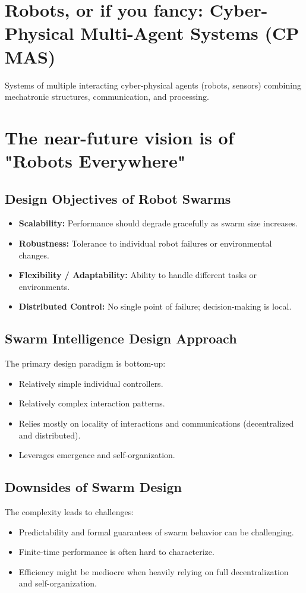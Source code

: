 \section*{Robots, or if you fancy: Cyber-Physical Multi-Agent Systems (CP MAS)}
Systems of multiple interacting cyber-physical agents (robots, sensors) combining mechatronic structures, communication, and processing.

\section*{The near-future vision is of "Robots Everywhere"}

\subsection*{Design Objectives of Robot Swarms}
\begin{itemize}
    \item \textbf{Scalability:} Performance should degrade gracefully as swarm size increases.
    \item \textbf{Robustness:} Tolerance to individual robot failures or environmental changes.
    \item \textbf{Flexibility / Adaptability:} Ability to handle different tasks or environments.
    \item \textbf{Distributed Control:} No single point of failure; decision-making is local.
\end{itemize}
\subsection*{Swarm Intelligence Design Approach}
The primary design paradigm is bottom-up:

\begin{itemize}
    \item Relatively simple individual controllers.
    \item Relatively complex interaction patterns.
    \item Relies mostly on locality of interactions and communications (decentralized and distributed).
    \item Leverages emergence and self-organization.
\end{itemize}

\subsection*{Downsides of Swarm Design}
The complexity leads to challenges:
\begin{itemize}
    \item Predictability and formal guarantees of swarm behavior can be challenging.
    \item Finite-time performance is often hard to characterize.
    \item Efficiency might be mediocre when heavily relying on full decentralization and self-organization.
\end{itemize}


